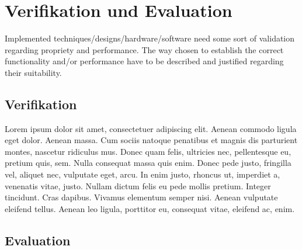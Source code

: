 \chapter{Verifikation und Evaluation}
\label{chap:veriundeval}

Implemented techniques/designs/hardware/software need some sort of validation regarding propriety and performance. The way chosen to establish the correct functionality and/or performance have to be described and justified regarding their suitability.

\section{Verifikation}
\label{sec:verifikation}

Lorem ipsum dolor sit amet, consectetuer adipiscing elit. Aenean commodo ligula eget dolor. Aenean massa. Cum sociis natoque penatibus et magnis dis parturient montes, nascetur ridiculus mus. Donec quam felis, ultricies nec, pellentesque eu, pretium quis, sem. Nulla consequat massa quis enim. Donec pede justo, fringilla vel, aliquet nec, vulputate eget, arcu. In enim justo, rhoncus ut, imperdiet a, venenatis vitae, justo. Nullam dictum felis eu pede mollis pretium. Integer tincidunt. Cras dapibus. Vivamus elementum semper nisi. Aenean vulputate eleifend tellus. Aenean leo ligula, porttitor eu, consequat vitae, eleifend ac, enim.

\section{Evaluation}
\label{sec:evaluation}
